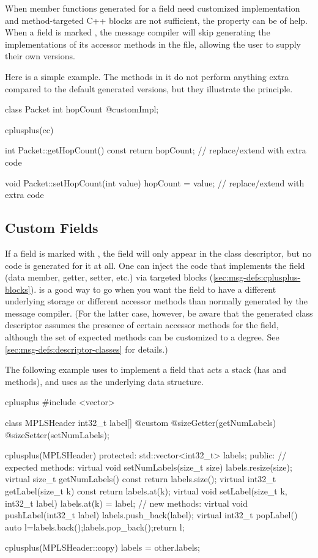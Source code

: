 When member functions generated for a field need customized implementation and
method-targeted C++ blocks are not sufficient, the  property
can be of help. When a field is marked , the message compiler
will skip generating the implementations of its accessor methods in the  file,
allowing the user to supply their own versions.

Here is a simple example. The methods in it do not perform anything extra
compared to the default generated versions, but they illustrate the principle.

\begin{msg}
class Packet
{
    int hopCount @customImpl;
}

cplusplus(cc) {{
int Packet::getHopCount() const
{
    return hopCount; // replace/extend with extra code
}

void Packet::setHopCount(int value)
{
    hopCount = value; // replace/extend with extra code
}
}}
\end{msg}


\subsection{Custom Fields}
\label{sec:msg-defs:custom-fields}

If a field is marked with , the field will only appear in the
class descriptor, but no code is generated for it at all. One can inject the
code that implements the field (data member, getter, setter, etc.) via targeted
 blocks (\ref{sec:msg-defs:cplusplus-blocks}).
 is a good way to go when you want the field to have a different
underlying storage or different accessor methods than normally generated by the
message compiler. (For the latter case, however, be aware that the generated
class descriptor assumes the presence of certain accessor methods for the
field, although the set of expected methods can be customized to a degree. See
\ref{sec:msg-defs:descriptor-classes} for details.)

The following example uses  to implement a field that acts a
stack (has  and  methods), and uses  as
the underlying data structure.

\begin{msg}
cplusplus {{
#include <vector>
}}

class MPLSHeader
{
    int32_t label[] @custom @sizeGetter(getNumLabels) @sizeSetter(setNumLabels);
}

cplusplus(MPLSHeader) {{
  protected:
    std::vector<int32_t> labels;
  public:
    // expected methods:
    virtual void setNumLabels(size_t size) {labels.resize(size);}
    virtual size_t getNumLabels() const {return labels.size();}
    virtual int32_t getLabel(size_t k) const {return labels.at(k);}
    virtual void setLabel(size_t k, int32_t label) {labels.at(k) = label;}
    // new methods:
    virtual void pushLabel(int32_t label) {labels.push_back(label);}
    virtual int32_t popLabel() {auto l=labels.back();labels.pop_back();return l;}
}}

cplusplus(MPLSHeader::copy) {{
    labels = other.labels;
}}
\end{msg}

